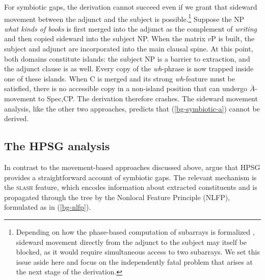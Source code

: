 \documentclass[12pt]{article}
\begin{document}
\ex\label{bg-sideward-tree}
\begin{center}
%
\end{center}
\xe

\noindent For symbiotic gaps, the derivation cannot succeed even if we grant that sideward movement between the adjunct and the subject is possible.\footnote{Depending on how the phase-based computation of subarrays is formalized \citep{nunes2000,nunes2004,nunes2012}, sideward movement directly from the adjunct to the subject may itself be blocked, as it would require simultaneous access to two subarrays. We set this issue aside here and focus on the independently fatal problem that arises at the next stage of the derivation.} Suppose the NP \emph{what kinds of books} is first merged into the adjunct as the complement of \emph{writing} and then copied sideward into the subject NP. When the matrix $v$P is built, the subject and adjunct are incorporated into the main clausal spine. At this point, both domains constitute islands: the subject NP is a barrier to extraction, and the adjunct clause is as well. Every copy of the \emph{wh}-phrase is now trapped inside one of these islands. When C is merged and its strong \emph{wh}-feature must be satisfied, there is no accessible copy in a non-island position that can undergo $\bar{A}$-movement to Spec,CP. The derivation therefore crashes. The sideward movement analysis, like the other two approaches, predicts that (\ref{bg-symbiotic-a}) cannot be derived.

\subsection{The HPSG analysis}\label{sec:hpsg}

In contrast to the movement-based approaches discussed above, \citeauthor{levine2003} argue that HPSG provides a straightforward account of symbiotic gaps. The relevant mechanism is the \textsc{slash} feature, which encodes information about extracted constituents and is propagated through the tree by the Nonlocal Feature Principle (NLFP), formulated as in (\ref{bg-nlfp}).
\end{document}
